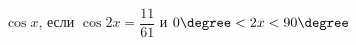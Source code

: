 \begin{ex}[type=calculate_expression]
	\begin{condition}
		\( \cos x \), \quad если \( \cos2x=\dfrac{11}{61} \) и \( 0\degree<2x<90\degree \)
	\end{condition}
\end{ex}